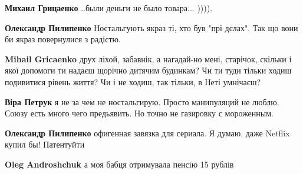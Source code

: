 \begin{itemize}
\begin{itemize}
\textbf{Михаил Грицаенко} ..были деньги не было товара... )))).

 
\textbf{Олександр Пилипенко} Ностальгують якраз ті, хто був "прі дєлах". Так що вони би якраз повернулися з радістю.

 
\textbf{Mihail Gricaenko} друх ліхой, забавнік, а нагадай-но мені, старічок,
скільки і якої допомоги ти надаєш щорічно дитячим будинкам?  Чи ти туди тільки
ходиш подивитися рівень життя?  Чи і не ходиш, так тільки, в Неті умнічаєш?

 
\textbf{Віра Петрук} я не за чем не ностальгирую. Просто манипуляций не люблю. Союзу есть много чего предьявить. Но точно не газировку с мороженным.

 
\textbf{Олександр Пилипенко} офигенная завязка для сериала. Я думаю, даже Netflix купил бы! Патентуйти

 
\textbf{Oleg Androshchuk} а моя бабця отримувала пенсію 15 рублів
\end{itemize}

 

\end{itemize}
